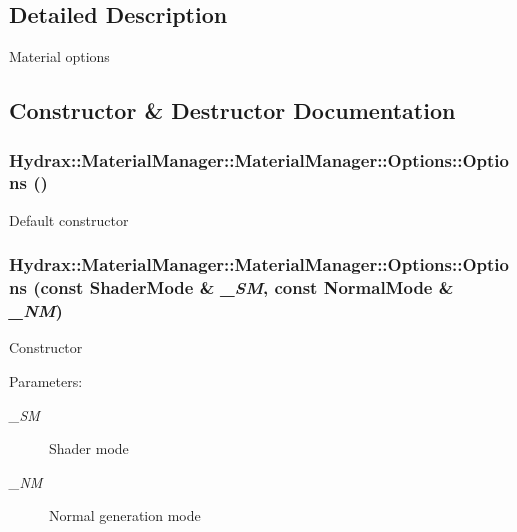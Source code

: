 \subsection{Detailed Description}
Material options 

\subsection{Constructor \& Destructor Documentation}
\hypertarget{struct_hydrax_1_1_material_manager_1_1_options_2c1f6c31e864bf4e73cb3a2fe2e373b6}{
\subsubsection[{Options}]{\setlength{\rightskip}{0pt plus 5cm}Hydrax::MaterialManager::MaterialManager::Options::Options ()}}
\label{struct_hydrax_1_1_material_manager_1_1_options_2c1f6c31e864bf4e73cb3a2fe2e373b6}


Default constructor \hypertarget{struct_hydrax_1_1_material_manager_1_1_options_af716f645ca8baf0228cfd411ba6bbda}{
\subsubsection[{Options}]{\setlength{\rightskip}{0pt plus 5cm}Hydrax::MaterialManager::MaterialManager::Options::Options (const {\bf ShaderMode} \& {\em \_\-SM}, \/  const {\bf NormalMode} \& {\em \_\-NM})}}
\label{struct_hydrax_1_1_material_manager_1_1_options_af716f645ca8baf0228cfd411ba6bbda}


Constructor \begin{Desc}
\item[Parameters:]
\begin{description}
\item[{\em \_\-SM}]Shader mode \item[{\em \_\-NM}]Normal generation mode \end{description}
\end{Desc}


